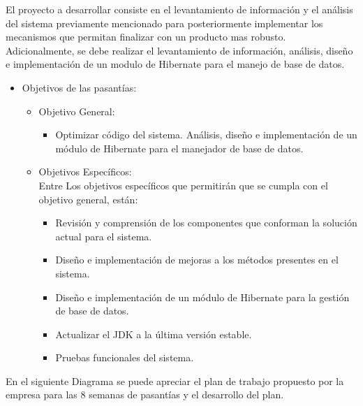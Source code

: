 \documentclass[12pt,oneside]{book}
\begin{document}
	El proyecto a desarrollar consiste en el levantamiento de información y el análisis del sistema previamente mencionado para posteriormente implementar los mecanismos que permitan finalizar con un producto mas robusto. \\
	
	Adicionalmente, se debe realizar el levantamiento de información, análisis, diseño e implementación de un modulo de Hibernate para el manejo de base de datos.
	
	\begin{itemize}
		
		\item Objetivos de las pasantías:	 
		\begin{itemize}
			\item Objetivo General:
			\begin{itemize}
				\item Optimizar código del sistema. Análisis, diseño e implementación de un módulo de Hibernate para el manejador de base de datos. 
			\end{itemize}
			\item Objetivos Específicos: \\
			Entre Los objetivos específicos que permitirán que se cumpla con el objetivo general, están:
			
			\begin{itemize}
				\item Revisión y comprensión de los componentes que conforman la solución actual para el sistema.
				\item Diseño e implementación de mejoras a los métodos presentes en el sistema.
				\item Diseño e implementación de un módulo de Hibernate para la gestión de base de datos.
				\item Actualizar el JDK a la última versión estable.
				\item Pruebas funcionales del sistema.
			\end{itemize} 
		\end{itemize}
		
	\end{itemize}
	
	En el siguiente Diagrama se puede apreciar el plan de trabajo propuesto por la empresa para las 8 semanas de pasantías y el desarrollo del plan.
	
\end{document}
